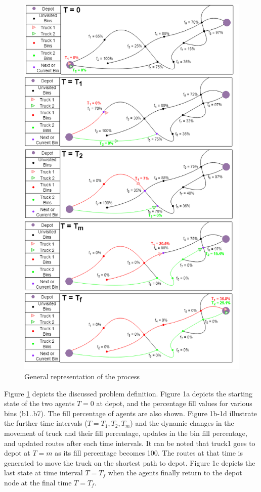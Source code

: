 \documentclass[12pt]{article}
\begin{document}
\begin{figure}[H]
    \centering
    \includegraphics[scale=0.6]{ExplainationFigure.png}
    \caption{General representation of the process}\label{fige}
\end{figure}

Figure \ref{fige} depicts the discussed problem definition. Figure 1a depicts the starting state of the two agents $T=0$ at depot, and the percentage fill values for various bins (b1..b7). The fill percentage of agents are also shown. Figure 1b-1d illustrate the further time intervals ($T=T_1,T_2,T_m$) and the dynamic changes in the movement of truck and their fill percentage, updates in the bin fill percentage, and updated routes after each time intervals. It can be noted that truck1 goes to depot at  $T=m$ as its fill percentage becomes 100. The routes at that time is generated to move the truck on the shortest path to depot. Figure 1e depicts the last state at time interval $T=T_f$ when the agents finally return to the depot node at the final time $T=T_f$.
\end{document}
